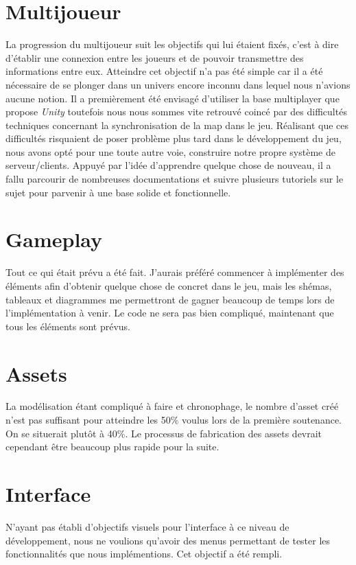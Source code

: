 \documentclass[12pt]{report}
\begin{document}
\section*{Multijoueur}

La progression du multijoueur suit les objectifs qui lui étaient fixés, c’est à dire d’établir une connexion entre les joueurs et de pouvoir transmettre des informations entre eux. Atteindre cet objectif n’a pas été simple car il a été nécessaire de se plonger dans un univers encore inconnu dans lequel nous n’avions aucune notion. Il a premièrement été envisagé d’utiliser la base multiplayer que propose \textit{Unity} toutefois nous nous sommes vite retrouvé coincé par des difficultés techniques concernant la synchronisation de la map dans le jeu. Réalisant que ces difficultés risquaient de poser problème plus tard dans le développement du jeu, nous avons opté pour une toute autre voie, construire notre propre système de serveur/clients. Appuyé par l’idée d’apprendre quelque chose de nouveau, il a fallu parcourir de nombreuses documentations et suivre plusieurs tutoriels sur le sujet pour parvenir à une base solide et fonctionnelle.

\section*{Gameplay}

Tout ce qui était prévu a été fait. J'aurais préféré commencer à implémenter des éléments afin d'obtenir quelque chose de concret dans le jeu, mais les shémas, tableaux et diagrammes me permettront de gagner beaucoup de temps lors de l'implémentation à venir. Le code ne sera pas bien compliqué, maintenant que tous les éléments sont prévus.

\section*{Assets}

La modélisation étant compliqué à faire et chronophage, le nombre d’asset créé n’est pas suffisant pour atteindre les 50\% voulus lors de la première soutenance. On se situerait plutôt à 40\%. Le processus de fabrication des assets devrait cependant être beaucoup plus rapide pour la suite.

\section*{Interface}

N’ayant pas établi d’objectifs visuels pour l’interface à ce niveau de développement, nous ne voulions qu’avoir des menus permettant de tester les fonctionnalités que nous implémentions. Cet objectif a été rempli.
\end{document}
